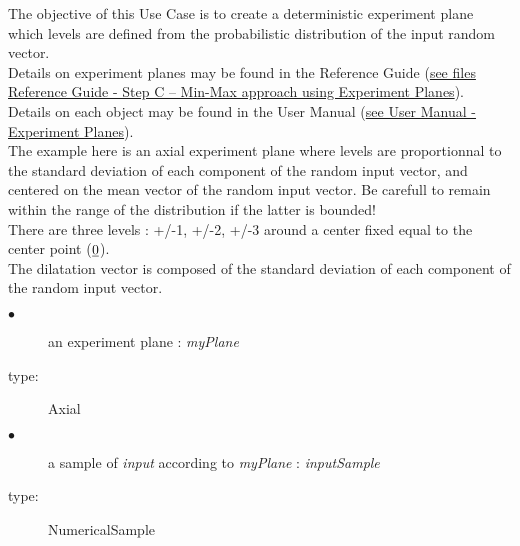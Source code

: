 \renewcommand{\filename}{docUC_MinMax_MixedDetRandExperimentPlane.tex}
\renewcommand{\filetitle}{UC : Creation of a mixed deterministic / random experiment plane}

\HeaderIIILevel

\label{determRandomExpPlane}


The objective of this Use Case is to  create a deterministic experiment plane which levels are defined from the probabilistic distribution of the input random vector.\\


Details on experiment planes  may be found in the Reference Guide (\href{OpenTURNS_ReferenceGuide.pdf}{see files Reference Guide - Step C -- Min-Max approach using Experiment Planes}).\\

Details on each object may be found in the User Manual  (\href{OpenTURNS_UserManual_TUI.pdf}{see User Manual - Experiment Planes}).\\


The example here is an axial experiment plane where levels are proportionnal to the standard deviation of each component of the random input vector, and centered on the mean vector of the random input vector. Be carefull to remain within the range of the distribution if the latter is bounded!\\
There are three levels  : +/-1, +/-2, +/-3 around a center fixed equal to the center point (${\underline{0}}$).\\
The dilatation vector is composed of the standard deviation of each component of the random input vector.\\

{
  \begin{description}
  \item[$\bullet$] an experiment plane : {\itshape myPlane}
  \item[type:] Axial
  \item[$\bullet$] a sample of {\itshape input} according to {\itshape myPlane} : {\itshape inputSample}
  \item[type:] NumericalSample
  \end{description}
}

